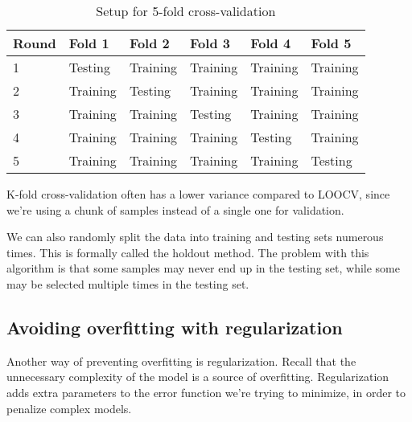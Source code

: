 \begin{table}
    \centering
    \caption{Setup for 5-fold cross-validation}
    \begin{tabular}{llllll}
        \hline
        Round & Fold 1                     & Fold 2                     & Fold 3                     & Fold 4                     & Fold 5                     \\
        \hline
        1     & \textcolor{SWJTU}{Testing} & Training                   & Training                   & Training                   & Training                   \\
        2     & Training                   & \textcolor{SWJTU}{Testing} & Training                   & Training                   & Training                   \\
        3     & Training                   & Training                   & \textcolor{SWJTU}{Testing} & Training                   & Training                   \\
        4     & Training                   & Training                   & Training                   & \textcolor{SWJTU}{Testing} & Training                   \\
        5     & Training                   & Training                   & Training                   & Training                   & \textcolor{SWJTU}{Testing} \\
        \hline
    \end{tabular}
\end{table}

K-fold cross-validation often has a lower variance compared to LOOCV, since we're using a chunk of samples instead of a single one for validation.

We can also randomly split the data into training and testing sets numerous times. This is formally called the holdout method. The problem with this algorithm is that some samples may never end up in the testing set, while some may be selected multiple times in the testing set.

\subsection{Avoiding overfitting with regularization}
Another way of preventing overfitting is regularization. Recall that the unnecessary complexity of the model is a source of overfitting. Regularization adds extra parameters to the error function we're trying to minimize, in order to penalize complex models.

